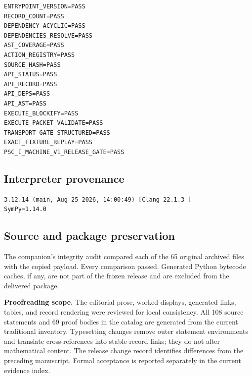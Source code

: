 \documentclass[a4paper,11pt]{article}
\begin{document}
\begin{lstlisting}
ENTRYPOINT_VERSION=PASS
RECORD_COUNT=PASS
DEPENDENCY_ACYCLIC=PASS
DEPENDENCIES_RESOLVE=PASS
AST_COVERAGE=PASS
ACTION_REGISTRY=PASS
SOURCE_HASH=PASS
API_STATUS=PASS
API_RECORD=PASS
API_DEPS=PASS
API_AST=PASS
EXECUTE_BLOCKIFY=PASS
EXECUTE_PACKET_VALIDATE=PASS
TRANSPORT_GATE_STRUCTURED=PASS
EXACT_FIXTURE_REPLAY=PASS
PSC_I_MACHINE_V1_RELEASE_GATE=PASS

\end{lstlisting}
\subsection*{Interpreter provenance}

\begin{lstlisting}
3.12.14 (main, Aug 25 2026, 14:00:49) [Clang 22.1.3 ]
SymPy=1.14.0

\end{lstlisting}
\subsection*{Source and package preservation}
The companion's integrity audit compared each of the 65 original archived files with the copied payload. Every comparison passed. Generated Python bytecode caches, if any, are not part of the frozen release and are excluded from the delivered package.

\textbf{Proofreading scope.} The editorial prose, worked displays, generated links, tables, and record rendering were reviewed for local consistency. All 108 source statements and 69 proof bodies in the catalog are generated from the current traditional inventory. Typesetting changes remove outer statement environments and translate cross-references into stable-record links; they do not alter mathematical content. The release change record identifies differences from the preceding manuscript. Formal acceptance is reported separately in the current evidence index.
\end{document}
